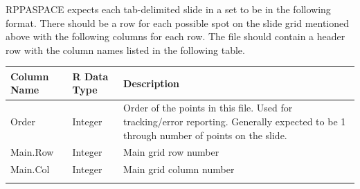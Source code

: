 \documentclass[
]{article}
\begin{document}
RPPASPACE expects each tab-delimited slide in a set to be in the
following format. There should be a row for each possible spot on the
slide grid mentioned above with the following columns for each row. The
file should contain a header row with the column names listed in the
following table.

\begin{longtable}[]{@{}lll@{}}
\toprule
\begin{minipage}[b]{0.26\columnwidth}\raggedright
Column Name\strut
\end{minipage} & \begin{minipage}[b]{0.26\columnwidth}\raggedright
R Data Type\strut
\end{minipage} & \begin{minipage}[b]{0.40\columnwidth}\raggedright
Description\strut
\end{minipage}\tabularnewline
\midrule
\endhead
\begin{minipage}[t]{0.26\columnwidth}\raggedright
Order\strut
\end{minipage} & \begin{minipage}[t]{0.26\columnwidth}\raggedright
Integer\strut
\end{minipage} & \begin{minipage}[t]{0.40\columnwidth}\raggedright
Order of the points in this file. Used for tracking/error reporting.
Generally expected to be 1 through number of points on the slide.\strut
\end{minipage}\tabularnewline
\begin{minipage}[t]{0.26\columnwidth}\raggedright
Main.Row\strut
\end{minipage} & \begin{minipage}[t]{0.26\columnwidth}\raggedright
Integer\strut
\end{minipage} & \begin{minipage}[t]{0.40\columnwidth}\raggedright
Main grid row number\strut
\end{minipage}\tabularnewline
\begin{minipage}[t]{0.26\columnwidth}\raggedright
Main.Col\strut
\end{minipage} & \begin{minipage}[t]{0.26\columnwidth}\raggedright
Integer\strut
\end{minipage} & \begin{minipage}[t]{0.40\columnwidth}\raggedright
Main grid column number\strut
\end{minipage}\tabularnewline
\begin{minipage}[t]{0.26\columnwidth}\raggedright

\end{minipage}
\end{longtable}
\end{document}
